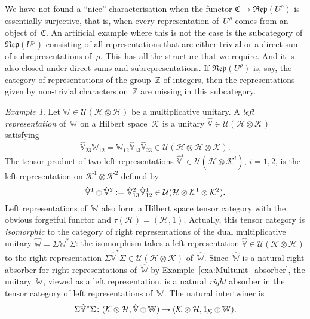 \documentclass[a4paper]{amsart}
\numberwithin{equation}{section}
\theoremstyle{plain}
\numberwithin{theorem}{section}
\theoremstyle{definition}
\theoremstyle{remark}
\newtheorem{example}[theorem]{Example}
\newcommand{\tenscorep}{\mathbin{\begin{tikzpicture}[baseline,x=.75ex,y=.75ex] \draw[line width=.2pt] (-0.8,1.15)--(0.8,1.15);\draw[line width=.2pt](0,-0.25)--(0,1.15); \draw[line width=.2pt] (0,0.75) circle [radius = 1];\end{tikzpicture}}}
\newcommand*{\Corep}[1]{\mathbb{#1}}          %
\newcommand*{\DuCorep}[1]{\hat{\Corep{#1}}}   %
\newcommand*{\Cat}{\mathfrak C}     %
\newcommand*{\Corepcat}[1]{\mathfrak{Rep}(#1)}%
\newcommand*{\Trivial}{\tau}%
\newcommand*{\Z}{\mathbb Z}
\newcommand*{\Multunit}[1][]{\mathbb W^{#1}}%
\newcommand*{\DuMultunit}{\widehat{\mathbb W}}%
\newcommand*{\Hils}[1][H]{\mathcal{#1}}%
\newcommand*{\U}{\mathcal U}%
\newcommand*{\defeq}{\mathrel{\vcentcolon=}}
\begin{document}
We have not found a ``nice'' characterisation when the functor
\(\Cat\to\Corepcat{U^\rho}\)
is essentially surjective, that is, when every representation
of~\(U^\rho\)
comes from an object of~\(\Cat\).
An artificial example where this is not the case is the subcategory of
\(\Corepcat{U^\rho}\)
consisting of all representations that are either trivial or a direct
sum of subrepresentations of~\(\rho\).
This has all the structure that we require.  And it is also closed
under direct sums and subrepresentations.  If \(\Corepcat{U^\rho}\)
is, say, the category of representations of the group~\(\Z\)
of integers, then the representations given by non-trivial characters
on~\(\Z\) are missing in this subcategory.

\begin{example}
  \label{exa:left_corep}
  Let \(\Multunit\in\U(\Hils\otimes\Hils)\)
  be a multiplicative unitary.  A \emph{left representation}
  of~\(\Multunit\) on a Hilbert space~\(\Hils[K]\) is a unitary
  \(\DuCorep{V}\in\U(\Hils\otimes\Hils[K])\) satisfying
  \[
  \DuCorep{V}_{23}\Multunit_{12}
  = \Multunit_{12} \DuCorep{V}_{13} \DuCorep{V}_{23}
  \in \U(\Hils\otimes\Hils\otimes\Hils[K]).
  \]
  The tensor product of two left representations
  \(\DuCorep{V}^i\in\U(\Hils\otimes\Hils[K]^i)\),
  \(i=1,2\), is the left representation on
  \(\Hils[K]^1\otimes\Hils[K]^2\) defined by
  \[
  \DuCorep{V}^1\tenscorep \DuCorep{V}^2 \defeq
  \DuCorep{V}^2_{13}\DuCorep{V}^1_{12} \in
  \U(\Hils\otimes\Hils[K]^1\otimes\Hils[K]^2).
  \]
  Left representations of~\(\Multunit\)
  also form a Hilbert space tensor category with the obvious forgetful
  functor and \(\Trivial(\Hils)=(\Hils,1)\).
  Actually, this tensor category is \emph{isomorphic} to the category
  of right representations of the dual multiplicative unitary
  \(\DuMultunit= \Sigma \Multunit[*]\Sigma\):
  the isomorphism takes a left representation
  \(\DuCorep{V}\in \U(\Hils[K]\otimes\Hils)\)
  to the right representation
  \(\Sigma \DuCorep{V}^* \Sigma \in \U(\Hils\otimes\Hils[K])\)
  of~\(\DuMultunit\).
  Since~\(\DuMultunit\)
  is a natural right absorber for right representations
  of~\(\DuMultunit\)
  by Example~\ref{exa:Multunit_absorber}, the unitary~\(\Multunit\),
  viewed as a left representation, is a natural \emph{right}
  absorber in the tensor category of left representations
  of~\(\Multunit\).  The natural intertwiner is
  \[
  \Sigma \DuCorep{V}^*\Sigma\colon
  (\Hils[K]\otimes\Hils, \DuCorep{V}\tenscorep\Multunit)
  \to (\Hils[K]\otimes\Hils, 1_{\Hils[K]}\tenscorep\Multunit).
  \]
\end{example}
\end{document}
